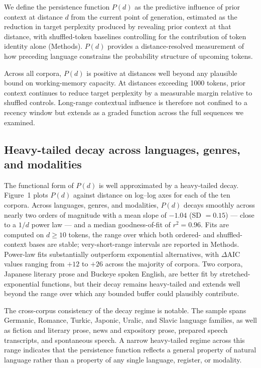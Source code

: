 \documentclass[11pt]{article}
\begin{document}
We define the persistence function $P(d)$ as the predictive influence of prior
context at distance $d$ from the current point of generation, estimated as the
reduction in target perplexity produced by revealing prior context at that distance,
with shuffled-token baselines controlling for the contribution of token identity
alone (Methods). $P(d)$ provides a distance-resolved measurement of how preceding
language constrains the probability structure of upcoming tokens.

Across all corpora, $P(d)$ is positive at distances well beyond any plausible bound
on working-memory capacity. At distances exceeding 1000 tokens, prior context
continues to reduce target perplexity by a measurable margin relative to shuffled
controls. Long-range contextual influence is therefore not confined to a recency
window but extends as a graded function across the full sequences we examined.

\subsection{Heavy-tailed decay across languages, genres, and modalities}

The functional form of $P(d)$ is well approximated by a heavy-tailed decay. Figure~1
plots $P(d)$ against distance on log--log axes for each of the ten corpora. Across
languages, genres, and modalities, $P(d)$ decays smoothly across nearly two orders of
magnitude with a mean slope of $-1.04$ (SD $=0.15$) --- close to a $1/d$ power law
--- and a median goodness-of-fit of $r^2 = 0.96$. Fits are computed on $d \geq 10$
tokens, the range over which both ordered- and shuffled-context bases are stable;
very-short-range intervals are reported in Methods. Power-law fits substantially
outperform exponential alternatives, with $\Delta$AIC values ranging from $+12$ to
$+26$ across the majority of corpora. Two corpora, Japanese literary prose and
Buckeye spoken English, are better fit by stretched-exponential functions, but their
decay remains heavy-tailed and extends well beyond the range over which any bounded
buffer could plausibly contribute.

The cross-corpus consistency of the decay regime is notable. The sample spans
Germanic, Romance, Turkic, Japonic, Uralic, and Slavic language families, as well as
fiction and literary prose, news and expository prose, prepared speech transcripts,
and spontaneous speech. A narrow heavy-tailed regime across this range indicates that
the persistence function reflects a general property of natural language rather than a
property of any single language, register, or modality.
\end{document}
